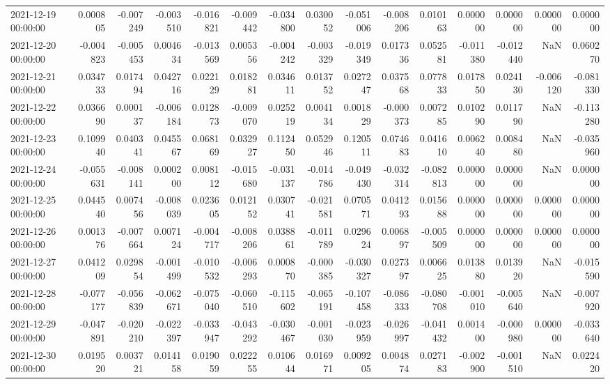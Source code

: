 \begin{tabular}{lrrrrrrrrrrrrrr}
2021-12-19 00:00:00 & 0.000805 & -0.007249 & -0.003510 & -0.016821 & -0.009442 & -0.034800 & 0.030052 & -0.051006 & -0.008206 & 0.010163 & 0.000000 & 0.000000 & 0.000000 & 0.000000 \\
2021-12-20 00:00:00 & -0.004823 & -0.005453 & 0.004634 & -0.013569 & 0.005356 & -0.004242 & -0.003329 & -0.019349 & 0.017336 & 0.052581 & -0.011380 & -0.012440 & NaN & 0.060270 \\
2021-12-21 00:00:00 & 0.034733 & 0.017494 & 0.042716 & 0.022129 & 0.018281 & 0.034611 & 0.013752 & 0.027247 & 0.037568 & 0.077833 & 0.017850 & 0.024130 & -0.006120 & -0.081330 \\
2021-12-22 00:00:00 & 0.036690 & 0.000137 & -0.006184 & 0.012873 & -0.009070 & 0.025219 & 0.004134 & 0.001829 & -0.000373 & 0.007285 & 0.010290 & 0.011790 & NaN & -0.113280 \\
2021-12-23 00:00:00 & 0.109940 & 0.040341 & 0.045567 & 0.068169 & 0.032927 & 0.112450 & 0.052946 & 0.120511 & 0.074683 & 0.041610 & 0.006240 & 0.008480 & NaN & -0.035960 \\
2021-12-24 00:00:00 & -0.055631 & -0.008141 & 0.000200 & 0.008112 & -0.015680 & -0.031137 & -0.014786 & -0.049430 & -0.032314 & -0.082813 & 0.000000 & 0.000000 & NaN & 0.000000 \\
2021-12-25 00:00:00 & 0.044540 & 0.007456 & -0.008039 & 0.023605 & 0.012152 & 0.030741 & -0.021581 & 0.070571 & 0.041293 & 0.015688 & 0.000000 & 0.000000 & 0.000000 & 0.000000 \\
2021-12-26 00:00:00 & 0.001376 & -0.007664 & 0.007124 & -0.004717 & -0.008206 & 0.038861 & -0.011789 & 0.029624 & 0.006897 & -0.005509 & 0.000000 & 0.000000 & 0.000000 & 0.000000 \\
2021-12-27 00:00:00 & 0.041209 & 0.029854 & -0.001499 & -0.010532 & -0.006293 & 0.000870 & -0.000385 & -0.030327 & 0.027397 & 0.006625 & 0.013880 & 0.013920 & NaN & -0.015590 \\
2021-12-28 00:00:00 & -0.077177 & -0.056839 & -0.062671 & -0.075040 & -0.060510 & -0.115602 & -0.065191 & -0.107458 & -0.086333 & -0.080708 & -0.001010 & -0.005640 & NaN & -0.007920 \\
2021-12-29 00:00:00 & -0.047891 & -0.020210 & -0.022397 & -0.033947 & -0.043292 & -0.030467 & -0.001030 & -0.023959 & -0.026997 & -0.041432 & 0.001400 & -0.000980 & 0.000000 & -0.033640 \\
2021-12-30 00:00:00 & 0.019520 & 0.003721 & 0.014158 & 0.019059 & 0.022255 & 0.010644 & 0.016971 & 0.009205 & 0.004874 & 0.027183 & -0.002900 & -0.001510 & NaN & 0.022420 \\

\end{tabular}
